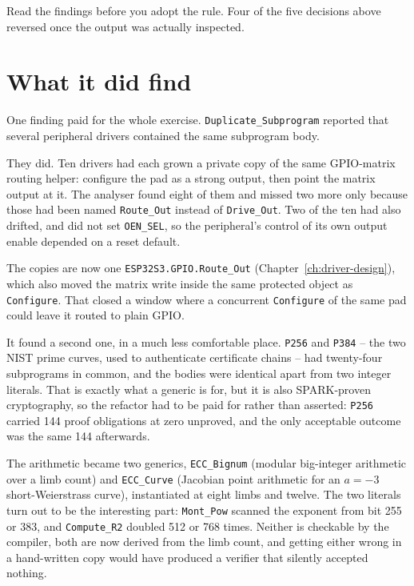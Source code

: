 Read the findings before you adopt the rule. Four of the five decisions above reversed
once the output was actually inspected.

\section{What it did find}

One finding paid for the whole exercise. \lstinline{Duplicate_Subprogram} reported that
several peripheral drivers contained the same subprogram body.

They did. Ten drivers had each grown a private copy of the same GPIO-matrix routing
helper: configure the pad as a strong output, then point the matrix output at it. The
analyser found eight of them and missed two more only because those had been named
\lstinline{Route_Out} instead of \lstinline{Drive_Out}. Two of the ten had also
drifted, and did not set \lstinline{OEN_SEL}, so the peripheral's control of its own
output enable depended on a reset default.

The copies are now one \lstinline{ESP32S3.GPIO.Route_Out}
(Chapter~\ref{ch:driver-design}), which also moved the matrix write inside the same
protected object as \lstinline{Configure}. That closed a window where a concurrent
\lstinline{Configure} of the same pad could leave it routed to plain GPIO.

It found a second one, in a much less comfortable place. \lstinline{P256} and
\lstinline{P384} -- the two NIST prime curves, used to authenticate certificate
chains -- had twenty-four subprograms in common, and the bodies were identical
apart from two integer literals. That is exactly what a generic is for, but it is
also SPARK-proven cryptography, so the refactor had to be paid for rather than
asserted: \lstinline{P256} carried 144 proof obligations at zero unproved, and the
only acceptable outcome was the same 144 afterwards.

The arithmetic became two generics, \lstinline{ECC_Bignum} (modular big-integer
arithmetic over a limb count) and \lstinline{ECC_Curve} (Jacobian point arithmetic
for an $a = -3$ short-Weierstrass curve), instantiated at eight limbs and twelve.
The two literals turn out to be the interesting part: \lstinline{Mont_Pow} scanned
the exponent from bit 255 or 383, and \lstinline{Compute_R2} doubled 512 or 768
times. Neither is checkable by the compiler, both are now derived from the limb
count, and getting either wrong in a hand-written copy would have produced a
verifier that silently accepted nothing.

